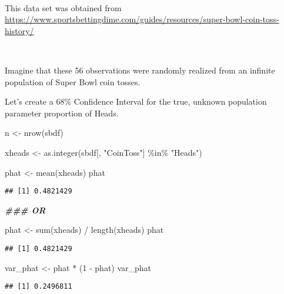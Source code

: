 \documentclass[
]{article}
\newenvironment{Shaded}{\begin{snugshade}}{\end{snugshade}}
\newcommand{\DecValTok}[1]{\textcolor[rgb]{0.00,0.00,0.81}{#1}}
\newcommand{\DocumentationTok}[1]{\textcolor[rgb]{0.56,0.35,0.01}{\textbf{\textit{#1}}}}
\newcommand{\FunctionTok}[1]{\textcolor[rgb]{0.00,0.00,0.00}{#1}}
\newcommand{\NormalTok}[1]{#1}
\newcommand{\OtherTok}[1]{\textcolor[rgb]{0.56,0.35,0.01}{#1}}
\newcommand{\SpecialCharTok}[1]{\textcolor[rgb]{0.00,0.00,0.00}{#1}}
\newcommand{\StringTok}[1]{\textcolor[rgb]{0.31,0.60,0.02}{#1}}
\begin{document}
~~

This data set was obtained from
\url{https://www.sportsbettingdime.com/guides/resources/super-bowl-coin-toss-history/}

~~

Imagine that these 56 observations were randomly realized from an
infinite population of Super Bowl coin tosses.

Let's create a 68\% Confidence Interval for the true, unknown population
parameter proportion of Heads.

\begin{Shaded}
\begin{Highlighting}[]
\NormalTok{n }\OtherTok{\textless{}{-}} \FunctionTok{nrow}\NormalTok{(sbdf)}

\NormalTok{xheads }\OtherTok{\textless{}{-}} \FunctionTok{as.integer}\NormalTok{(sbdf[, }\StringTok{"CoinToss"}\NormalTok{] }\SpecialCharTok{\%in\%} \StringTok{"Heads"}\NormalTok{)}

\NormalTok{phat }\OtherTok{\textless{}{-}} \FunctionTok{mean}\NormalTok{(xheads)}
\NormalTok{phat}
\end{Highlighting}
\end{Shaded}

\begin{verbatim}
## [1] 0.4821429
\end{verbatim}

\begin{Shaded}
\begin{Highlighting}[]
\DocumentationTok{\#\#\# OR}

\NormalTok{phat }\OtherTok{\textless{}{-}} \FunctionTok{sum}\NormalTok{(xheads) }\SpecialCharTok{/} \FunctionTok{length}\NormalTok{(xheads)}
\NormalTok{phat}
\end{Highlighting}
\end{Shaded}

\begin{verbatim}
## [1] 0.4821429
\end{verbatim}

\begin{Shaded}
\begin{Highlighting}[]
\NormalTok{var\_phat }\OtherTok{\textless{}{-}}\NormalTok{ phat }\SpecialCharTok{*}\NormalTok{ (}\DecValTok{1} \SpecialCharTok{{-}}\NormalTok{ phat)}
\NormalTok{var\_phat}
\end{Highlighting}
\end{Shaded}

\begin{verbatim}
## [1] 0.2496811
\end{verbatim}
\end{document}
